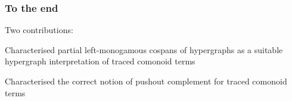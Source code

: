     \begin{frame}
        \frametitle{To the end}

        \center

        \LARGE
        Two contributions:

        \pause

        \Large
        Characterised \alert{partial left-monogamous} cospans of hypergraphs as
        a suitable hypergraph interpretation of traced comonoid terms

        \vspace{1em}

        \pause

        Characterised the correct notion of \alert{pushout complement} for
        traced comonoid terms

    \end{frame}
